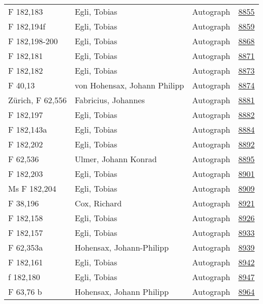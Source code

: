 \documentclass[10pt,a4paper,landscape]{report}
\begin{document}
\begin{longtable}{p{16cm}p{4cm}lr}
F 182,183	&	Egli, Tobias	&	Autograph	&	\href{http://130.60.24.72/assignment/8855}{8855}\\
F 182,194f	&	Egli, Tobias	&	Autograph	&	\href{http://130.60.24.72/assignment/8859}{8859}\\
F 182,198-200	&	Egli, Tobias	&	Autograph	&	\href{http://130.60.24.72/assignment/8868}{8868}\\
F 182,181	&	Egli, Tobias	&	Autograph	&	\href{http://130.60.24.72/assignment/8871}{8871}\\
F 182,182	&	Egli, Tobias	&	Autograph	&	\href{http://130.60.24.72/assignment/8873}{8873}\\
F 40,13	&	von Hohensax, Johann Philipp	&	Autograph	&	\href{http://130.60.24.72/assignment/8874}{8874}\\
Zürich, F 62,556	&	Fabricius, Johannes	&	Autograph	&	\href{http://130.60.24.72/assignment/8881}{8881}\\
F 182,197	&	Egli, Tobias	&	Autograph	&	\href{http://130.60.24.72/assignment/8882}{8882}\\
F 182,143a	&	Egli, Tobias	&	Autograph	&	\href{http://130.60.24.72/assignment/8884}{8884}\\
F 182,202	&	Egli, Tobias	&	Autograph	&	\href{http://130.60.24.72/assignment/8892}{8892}\\
F 62,536	&	Ulmer, Johann Konrad	&	Autograph	&	\href{http://130.60.24.72/assignment/8895}{8895}\\
F 182,203	&	Egli, Tobias	&	Autograph	&	\href{http://130.60.24.72/assignment/8901}{8901}\\
Ms F 182,204	&	Egli, Tobias	&	Autograph	&	\href{http://130.60.24.72/assignment/8909}{8909}\\
F 38,196	&	Cox, Richard	&	Autograph	&	\href{http://130.60.24.72/assignment/8921}{8921}\\
F 182,158	&	Egli, Tobias	&	Autograph	&	\href{http://130.60.24.72/assignment/8926}{8926}\\
F 182,157	&	Egli, Tobias	&	Autograph	&	\href{http://130.60.24.72/assignment/8933}{8933}\\
F 62,353a	&	Hohensax, Johann-Philipp	&	Autograph	&	\href{http://130.60.24.72/assignment/8939}{8939}\\
F 182,161	&	Egli, Tobias	&	Autograph	&	\href{http://130.60.24.72/assignment/8942}{8942}\\
f 182,180	&	Egli, Tobias	&	Autograph	&	\href{http://130.60.24.72/assignment/8947}{8947}\\
F 63,76 b	&	Hohensax, Johann Philipp	&	Autograph	&	\href{http://130.60.24.72/assignment/8964}{8964}\\

\end{longtable}
\end{document}
